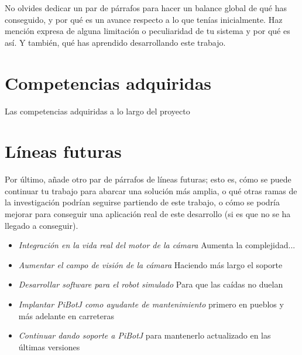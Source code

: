 No olvides dedicar un par de párrafos para hacer un balance global de qué has conseguido, y por qué es un avance respecto a lo que tenías inicialmente. Haz mención expresa de alguna limitación o peculiaridad de tu sistema y por qué es así. Y también, qué has aprendido desarrollando este trabajo.\\



\section{Competencias adquiridas}

Las competencias adquiridas a lo largo del proyecto

\section{Líneas futuras}


Por último, añade otro par de párrafos de líneas futuras; esto es, cómo se puede continuar tu trabajo para abarcar una solución más amplia, o qué otras ramas de la investigación podrían seguirse partiendo de este trabajo, o cómo se podría mejorar para conseguir una aplicación real de este desarrollo (si es que no se ha llegado a conseguir).


\begin{itemize}
	\item \textit{Integración en la vida real del motor de la cámara} Aumenta la complejidad...
	\item \textit{Aumentar el campo de visión de la cámara} Haciendo más largo el soporte
	\item \textit{Desarrollar software para el robot simulado} Para que las caídas no duelan
	\item \textit{Implantar PiBotJ como ayudante de mantenimiento} primero en pueblos y más adelante en carreteras
	\item \textit{Continuar dando soporte a PiBotJ} para mantenerlo actualizado en las últimas versiones
\end{itemize}\

